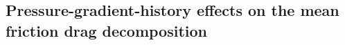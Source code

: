 %
%
%




\subsection{Pressure-gradient-history effects on the mean friction drag decomposition}\label{hist}


